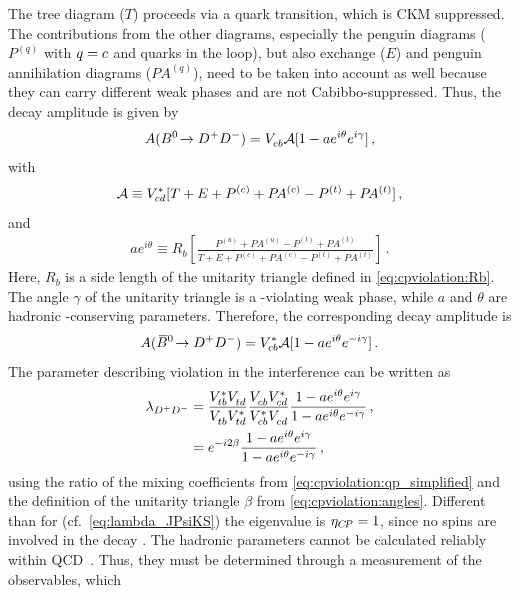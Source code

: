The tree diagram ($T$) proceeds via a \bToccbard quark transition, which is
CKM suppressed. The contributions from the other diagrams, especially the
penguin diagrams ($P^{(q)}$ with $q = {c}$ and \tquark quarks in the
loop), but also exchange ($E$) and penguin annihilation diagrams
($P\!A^{(q)}$), need to be taken into account as well because they can carry
different weak phases and are not Cabibbo-suppressed. Thus, the decay
amplitude is given by~\cite{Fleischer1999,Fleischer2007,Bel:2015wha}
\begin{align}
	A({{B}^0}\!\rightarrow {\ensuremath{{D}^+}}{\ensuremath{{D}^-}}) = {V_{{c}{b}}^{}} \mathcal{A}[1 - ae^{i\theta}e^{i\gamma}]\,,
\end{align}
with
\begin{align}
	\mathcal{A} \equiv {\ensuremath{V_{{c}{d}}^\ast}}[T + E + {P^{(c)} + P\!A^{(c)}} - {P^{(t)} + P\!A^{(t)}}]\,,
\end{align}
and
\begin{align}
	ae^{i\theta} \equiv R_b\left[\frac{{P^{(u)} + P\!A^{(u)}} - {P^{(t)} + P\!A^{(t)}}}{T + E + {{P^{(c)} + P\!A^{(c)}} - {P^{(t)} + P\!A^{(t)}}}}\right]\,.
\end{align}
Here, $R_b$ is a side length of the unitarity triangle defined in
\cref{eq:cpviolation:Rb}. The angle $\gamma$ of the unitarity triangle is a
\CP-violating weak phase, while $a$ and $\theta$ are hadronic \CP-conserving
parameters. Therefore, the corresponding \Bzb decay amplitude is
\begin{align}
	A({{\kern 0.18em\overline{\kern -0.18em B}{}}{}^0}\!\rightarrow {\ensuremath{{D}^+}}{\ensuremath{{D}^-}}) = {V_{{c}{b}}^\ast} \mathcal{A}[1 - ae^{i\theta}e^{-i\gamma}]\,.
\end{align}
The parameter describing \CP violation in the interference can be written as
\begin{align}
\begin{split}
	\lambda_{{{D}^+}{{D}^-}} &= \frac{{V_{{t}{b}}^\ast}{V_{{t}{d}}^{}}}{{V_{{t}{b}}^{}}{V_{{t}{d}}^\ast}}\frac{{V_{{c}{b}}^{}}{V_{{c}{d}}^\ast}}{{V_{{c}{b}}^\ast}{V_{{c}{d}}^{}}}\frac{1-ae^{i\theta}e^{i\gamma}}{1-ae^{i\theta}e^{-i\gamma}}\,,\\
					 &= e^{-i2\beta}\frac{1-ae^{i\theta}e^{i\gamma}}{1-ae^{i\theta}e^{-i\gamma}}\,,
\end{split}
\end{align}
using the ratio of the mixing coefficients from
\cref{eq:cpviolation:qp_simplified} and the definition of the unitarity
triangle $\beta$ from \cref{eq:cpviolation:angles}. Different than for
\BdToJPsiKS (cf.~\cref{eq:lambda_JPsiKS}) the \CP eigenvalue is $\eta_{{C\!P}} =
\num{+1}$, since no spins are involved in the decay \BdToDD. The hadronic
parameters cannot be calculated reliably within QCD~\cite{Bel:2015wha}. Thus,
they must be determined through a measurement of the \CP observables, which
